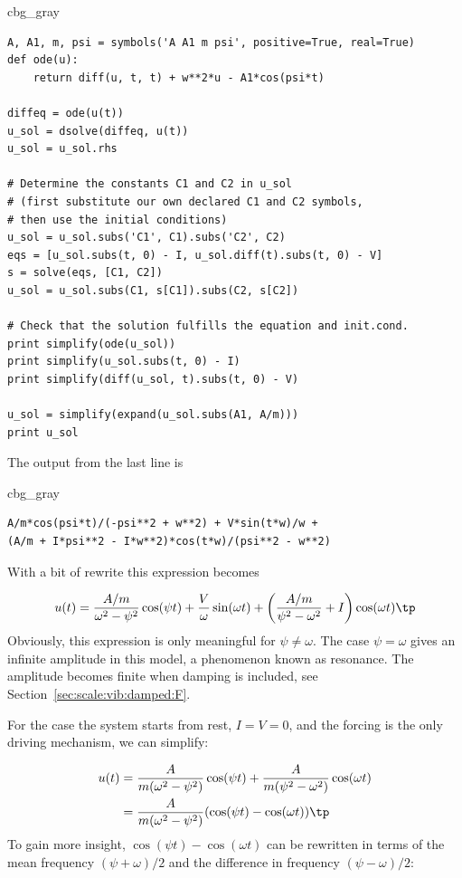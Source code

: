 \documentclass[graybox,envcountchap,sectrefs,final]{svmonodo}
\newenvironment{_cod_tight}[1]{
   \def\FrameCommand{\colorbox{#1}}
   \FrameRule0.6pt\MakeFramed {\FrameRestore}\vskip3mm}
   {\vskip0mm\endMakeFramed}
\newenvironment{cod}[1]{
\bgroup\rmfamily
\fboxsep=0mm\relax
\begin{_cod_tight}{#1}
\list{}{\parsep=-2mm\parskip=0mm\topsep=0pt\leftmargin=2mm
\rightmargin=2\leftmargin\leftmargin=4pt\relax}
\item\relax}
{\endlist\end{_cod_tight}\egroup}
\begin{document}
\begin{cod}{cbg_gray}\begin{Verbatim}[numbers=none,fontsize=\fontsize{9pt}{9pt},baselinestretch=0.95,xleftmargin=2mm]
A, A1, m, psi = symbols('A A1 m psi', positive=True, real=True)
def ode(u):
    return diff(u, t, t) + w**2*u - A1*cos(psi*t)

diffeq = ode(u(t))
u_sol = dsolve(diffeq, u(t))
u_sol = u_sol.rhs

# Determine the constants C1 and C2 in u_sol
# (first substitute our own declared C1 and C2 symbols,
# then use the initial conditions)
u_sol = u_sol.subs('C1', C1).subs('C2', C2)
eqs = [u_sol.subs(t, 0) - I, u_sol.diff(t).subs(t, 0) - V]
s = solve(eqs, [C1, C2])
u_sol = u_sol.subs(C1, s[C1]).subs(C2, s[C2])

# Check that the solution fulfills the equation and init.cond.
print simplify(ode(u_sol))
print simplify(u_sol.subs(t, 0) - I)
print simplify(diff(u_sol, t).subs(t, 0) - V)

u_sol = simplify(expand(u_sol.subs(A1, A/m)))
print u_sol
\end{Verbatim}
\end{cod}
\noindent
The output from the last line is

\begin{cod}{cbg_gray}\begin{Verbatim}[numbers=none,fontsize=\fontsize{9pt}{9pt},baselinestretch=0.95,xleftmargin=2mm]
A/m*cos(psi*t)/(-psi**2 + w**2) + V*sin(t*w)/w +
(A/m + I*psi**2 - I*w**2)*cos(t*w)/(psi**2 - w**2)
\end{Verbatim}
\end{cod}
\noindent
With a bit of rewrite this expression becomes


\[ u(t) = \frac{A/m}{\omega^2 - \psi^2}\cos(\psi t) + \frac{V}{\omega}
   \sin(\omega t) +
\left(\frac{A/m}{\psi^2 - \omega^2} + I\right) \cos (\omega t)\tp
\]
Obviously, this expression is only meaningful for $\psi\neq\omega$. The
case $\psi = \omega$ gives an infinite amplitude in this model, a
phenomenon known as resonance. The amplitude becomes finite when
damping is included,
see Section~\ref{sec:scale:vib:damped:F}.

For the case the system starts from rest, $I=V=0$, and the
forcing is the only driving mechanism, we can simplify:

\begin{align*}
u(t) &= \frac{A}{m(\omega^2 - \psi^2)}\cos(\psi t)
+
\frac{A}{m(\psi^2 - \omega^2)}\cos (\omega t)\\ 
&= \frac{A}{m(\omega^2 - \psi^2)}(\cos(\psi t) - \cos(\omega t))\tp
\end{align*}
To gain more insight, $\cos(\psi t) - \cos(\omega t)$ can be
rewritten in terms of the mean frequency $(\psi + \omega)/2$ and
the difference in frequency $(\psi - \omega)/2$:
\end{document}
